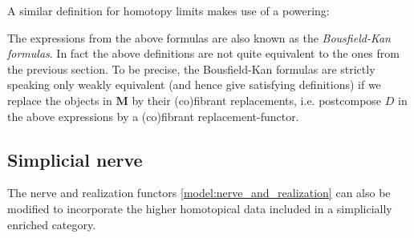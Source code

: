     A similar definition for homotopy limits makes use of a powering:
    \begin{remark}
        The expressions from the above formulas are also known as the \textit{Bousfield-Kan formulas}. In fact the above definitions are not quite equivalent to the ones from the previous section. To be precise, the Bousfield-Kan formulas are strictly speaking only weakly equivalent (and hence give satisfying definitions) if we replace the objects in $\mathbf{M}$ by their (co)fibrant replacements, i.e. postcompose $D$ in the above expressions by a (co)fibrant replacement-functor.
    \end{remark}

\subsection{Simplicial nerve}

    The nerve and realization functors \ref{model:nerve_and_realization} can also be modified to incorporate the higher homotopical data included in a simplicially enriched category.

